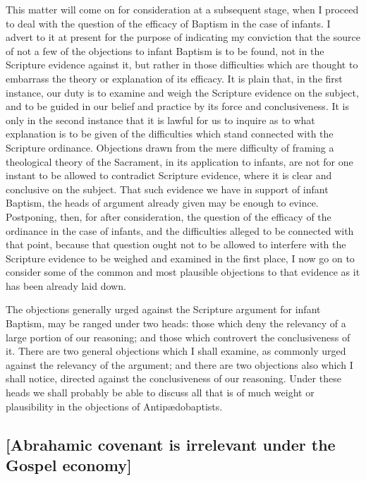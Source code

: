 \documentclass[
]{book}
\begin{document}
This matter will come on for consideration at a subsequent stage, when I proceed to deal with the question of the efficacy of Baptism in the case of infants. I advert to it at present for the purpose of indicating my conviction that the source of not a few of the objections to infant Baptism is to be found, not in the Scripture evidence against it, but rather in those difficulties which are thought to embarrass the theory or explanation of its efficacy. It is plain that, in the first instance, our duty is to examine and weigh the Scripture evidence on the subject, and to be guided in our belief and practice by its force and conclusiveness. It is only in the second instance that it is lawful for us to inquire as to what explanation is to be given of the difficulties which stand connected with the Scripture ordinance. Objections drawn from the mere difficulty of framing a theological theory of the Sacrament, in its application to infants, are not for one instant to be allowed to contradict Scripture evidence, where it is clear and conclusive on the subject. That such evidence we have in support of infant Baptism, the heads of argument already given may be enough to evince. Postponing, then, for after consideration, the question of the efficacy of the ordinance in the case of infants, and the difficulties alleged to be connected with that point, because that question ought not to be allowed to interfere with the Scripture evidence to be weighed and examined in the first place, I now go on to consider some of the common and most plausible objections to that evidence as it has been already laid down.

The objections generally urged against the Scripture argument for infant Baptism, may be ranged under two heads: those which deny the relevancy of a large portion of our reasoning; and those which controvert the conclusiveness of it. There are two general objections which I shall examine, as commonly urged against the relevancy of the argument; and there are two objections also which I shall notice, directed against the conclusiveness of our reasoning. Under these heads we shall probably be able to discuss all that is of much weight or plausibility in the objections of Antipædobaptists.

\hypertarget{abrahamic-covenant-is-irrelevant-under-the-gospel-economy}{%
\subsection{{[}Abrahamic covenant is irrelevant under the Gospel economy{]}}\label{abrahamic-covenant-is-irrelevant-under-the-gospel-economy}}
\end{document}

